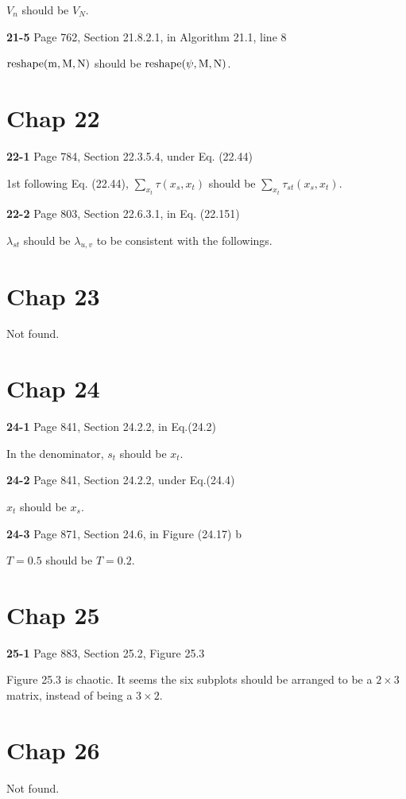 \documentclass[aps,preprint,a4]{revtex4-1}
\begin{document}
$V_{n}$ should be $V_{N}$.

{\color{red}\textbf{21-5}} Page 762, Section 21.8.2.1, in Algorithm 21.1, line 8

$\rm reshape(m,M,N)$ should be $\rm reshape(\psi,M,N)$.




\section{Chap 22}
{\color{red}\textbf{22-1}} Page 784, Section 22.3.5.4, under Eq. (22.44)

1st following Eq. (22.44), $\sum_{x_{t}}\tau(x_{s},x_{t})$ should be $\sum_{x_{t}}\tau_{st}(x_{s},x_{t})$.

{\color{red}\textbf{22-2}} Page 803, Section 22.6.3.1, in Eq. (22.151)

$\lambda_{st}$ should be $\lambda_{u,v}$ to be consistent with the followings.


\section{Chap 23}
Not found.




\section{Chap 24}
{\color{red}\textbf{24-1}} Page 841, Section 24.2.2, in Eq.(24.2)

In the denominator, $s_{t}$ should be $x_{t}$.

{\color{red}\textbf{24-2}} Page 841, Section 24.2.2, under Eq.(24.4)

$x_{t}$ should be $x_{s}$.

{\color{red}\textbf{24-3}} Page 871, Section 24.6, in Figure (24.17) b

$T = 0.5$ should be $T = 0.2$.


\section{Chap 25}
{\color{red}\textbf{25-1}} Page 883, Section 25.2, Figure 25.3

Figure 25.3 is chaotic. It seems the six subplots should be arranged to be a $2 \times 3$ matrix, instead of
being a $3 \times 2$.


\section{Chap 26}
Not found.
\end{document}
